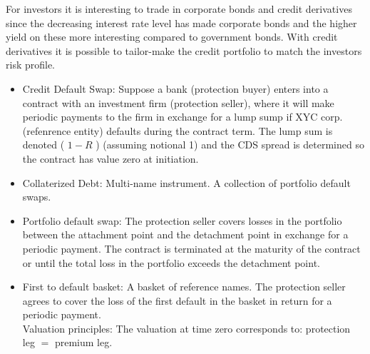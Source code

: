 For investors it is interesting to trade in corporate bonds and credit derivatives since the decreasing interest rate level has made corporate bonds and the higher yield on these more interesting compared to government bonds. With credit derivatives it is possible to tailor-make the credit portfolio to match the investors risk profile.

\begin{itemize}
  \item Credit Default Swap: Suppose a bank (protection buyer) enters into a contract with an investment firm (protection seller), where it will make periodic payments to the firm in exchange for a lump sump if XYC corp. (refenrence entity) defaults during the contract term. The lump sum is denoted ( $1-R$ ) (assuming notional 1) and the CDS spread is determined so the contract has value zero at initiation.
  \item Collaterized Debt: Multi-name instrument. A collection of portfolio default swaps.
  \item Portfolio default swap: The protection seller covers losses in the portfolio between the attachment point and the detachment point in exchange for a periodic payment. The contract is terminated at the maturity of the contract or until the total loss in the portfolio exceeds the detachment point.
  \item First to default basket: A basket of reference names. The protection seller agrees to cover the loss of the first default in the basket in return for a periodic payment.\\
Valuation principles: The valuation at time zero corresponds to: protection leg $=$ premium leg.
\end{itemize}


